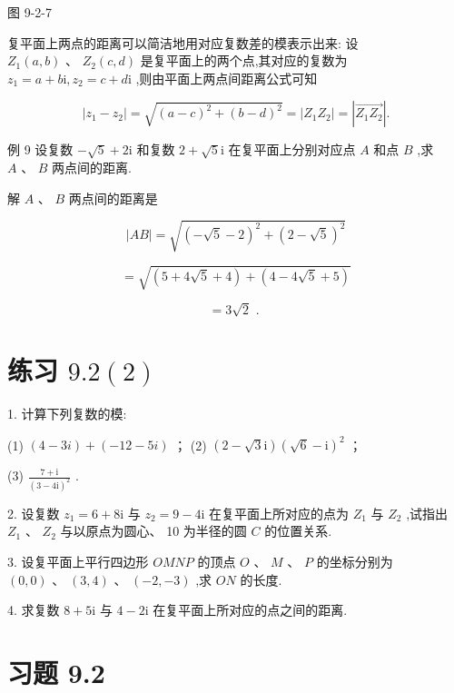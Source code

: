 \documentclass[10pt]{article}
\begin{document}
图 9-2-7

复平面上两点的距离可以简洁地用对应复数差的模表示出来: 设 \({Z}_{1}\left( {a,b}\right) \text{ 、 }{Z}_{2}\left( {c,d}\right)\) 是复平面上的两个点,其对应的复数为 \({z}_{1} = a + b\mathrm{i},{z}_{2} = c + d\mathrm{i}\) ,则由平面上两点间距离公式可知

\[
\left| {{z}_{1} - {z}_{2}}\right|  = \sqrt{{\left( a - c\right) }^{2} + {\left( b - d\right) }^{2}} = \left| {{Z}_{1}{Z}_{2}}\right|  = \left| \overrightarrow{{Z}_{1}{Z}_{2}}\right| .
\]

例 9 设复数 \(- \sqrt{5} + {2\mathrm{i}}\) 和复数 \(2 + \sqrt{5}\mathrm{i}\) 在复平面上分别对应点 \(A\) 和点 \(B\) ,求 \(A\text{ 、 }B\) 两点间的距离.

解 \(A\text{ 、 }B\) 两点间的距离是

\[
\left| {AB}\right|  = \sqrt{{\left( -\sqrt{5} - 2\right) }^{2} + {\left( 2 - \sqrt{5}\right) }^{2}}
\]

\[
= \sqrt{\left( {5 + 4\sqrt{5} + 4}\right)  + \left( {4 - 4\sqrt{5} + 5}\right) }
\]

\[
= 3\sqrt{2}\text{ . }
\]

\section*{练习 \({9.2}\left( 2\right)\)}

1. 计算下列复数的模:

(1) \(\left( {4 - {3i}}\right)  + \left( {-{12} - {5i}}\right)\) ； (2) \(\left( {2 - \sqrt{3}\mathrm{i}}\right) {\left( \sqrt{6} - \mathrm{i}\right) }^{2}\) ；

(3) \(\frac{7 + \mathrm{i}}{{\left( 3 - 4\mathrm{i}\right) }^{2}}\) .

2. 设复数 \({z}_{1} = 6 + 8\mathrm{i}\) 与 \({z}_{2} = 9 - 4\mathrm{i}\) 在复平面上所对应的点为 \({Z}_{1}\) 与 \({Z}_{2}\) ,试指出 \({Z}_{1}\text{ 、 }{Z}_{2}\) 与以原点为圆心、 10 为半径的圆 \(C\) 的位置关系.

3. 设复平面上平行四边形 \({OMNP}\) 的顶点 \(O\text{ 、 }M\text{ 、 }P\) 的坐标分别为 \(\left( {0,0}\right) \text{ 、 }\left( {3,4}\right)\) 、 \(\left( {-2, - 3}\right)\) ,求 \({ON}\) 的长度.

4. 求复数 \(8 + 5\mathrm{i}\) 与 \(4 - 2\mathrm{i}\) 在复平面上所对应的点之间的距离.

\section*{习题 9.2}
\end{document}
